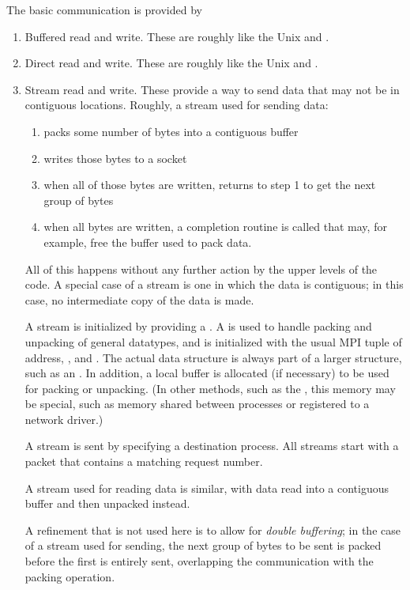 The basic communication is provided by
\begin{enumerate}
\item Buffered read and write.  These are roughly like the Unix
 and .
\item Direct read and write.  These are roughly like the Unix
 and .  
\item Stream read and write.  These provide a way to send data that
may not be in contiguous locations.  Roughly, a stream used for
    sending data:
    \begin{enumerate}
    \item packs some number of bytes into a contiguous buffer
    \item writes those bytes to a socket
    \item when all of those bytes are written, returns to step 1 to
    get the next group of bytes
    \item when all bytes are written, a completion routine is called
    that may, for example, free the buffer used to pack data.
    \end{enumerate}

    All of this happens without any further action by the upper levels
    of the code.  A special case of a stream is one in which the data
    is contiguous; in this case, no intermediate copy of the data is
    made.

    A stream is initialized by providing a .  A
     is used to handle packing and unpacking of general 
    datatypes, and is initialized with the usual MPI tuple of
     address, , and .  The
    actual  data structure is always part of a larger 
    structure, such as an .  In addition, 
    a local buffer is allocated (if necessary) to be used for packing
    or unpacking.  (In other methods, such as the \shmemname, this
    memory may be special, such as memory shared between processes or
    registered to a network driver.)  

    A stream is sent by specifying a destination process.  All streams
    start with a  packet that contains a
    matching request number.

    A stream used for reading data is similar, with data read into a
    contiguous buffer and then unpacked instead.

    A refinement that is not used here is to allow for \emph{double
    buffering}; in the case of a stream used for sending, the next
    group of bytes to be sent is packed before the first is entirely
    sent, overlapping the communication with the packing operation.


\end{enumerate}
